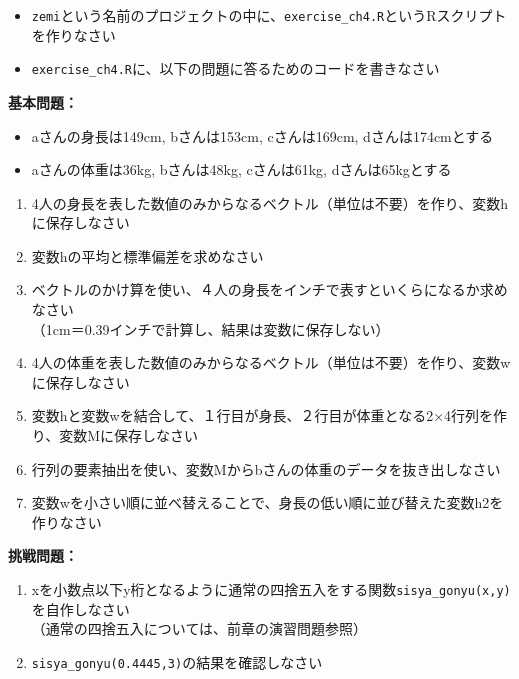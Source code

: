 \documentclass[
]{book}
\providecommand{\tightlist}{%
  \setlength{\itemsep}{0pt}\setlength{\parskip}{0pt}}
\begin{document}
\begin{itemize}
\tightlist
\item
  \texttt{zemi}という名前のプロジェクトの中に、\texttt{exercise\_ch4.R}というRスクリプトを作りなさい\\
\item
  \texttt{exercise\_ch4.R}に、以下の問題に答るためのコードを書きなさい
\end{itemize}

\textbf{基本問題：}

\begin{itemize}
\tightlist
\item
  aさんの身長は149cm, bさんは153cm, cさんは169cm, dさんは174cmとする
\item
  aさんの体重は36kg, bさんは48kg, cさんは61kg, dさんは65kgとする\\
\end{itemize}

\begin{enumerate}
\def\labelenumi{\arabic{enumi}.}
\tightlist
\item
  4人の身長を表した数値のみからなるベクトル（単位は不要）を作り、変数hに保存しなさい\\
\item
  変数hの平均と標準偏差を求めなさい\\
\item
  ベクトルのかけ算を使い、４人の身長をインチで表すといくらになるか求めなさい\\
  （1cm＝0.39インチで計算し、結果は変数に保存しない）\\
\item
  4人の体重を表した数値のみからなるベクトル（単位は不要）を作り、変数wに保存しなさい
\item
  変数hと変数wを結合して、１行目が身長、２行目が体重となる2×4行列を作り、変数Mに保存しなさい\\
\item
  行列の要素抽出を使い、変数Mからbさんの体重のデータを抜き出しなさい
\item
  変数wを小さい順に並べ替えることで、身長の低い順に並び替えた変数h2を作りなさい
\end{enumerate}

\textbf{挑戦問題：}

\begin{enumerate}
\def\labelenumi{\arabic{enumi}.}
\tightlist
\item
  xを小数点以下y桁となるように通常の四捨五入をする関数\texttt{sisya\_gonyu(x,y)}を自作しなさい\\
  （通常の四捨五入については、前章の演習問題参照）
\item
  \texttt{sisya\_gonyu(0.4445,3)}の結果を確認しなさい
\end{enumerate}
\end{document}
